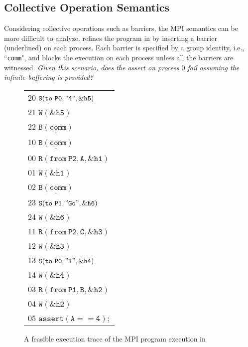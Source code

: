 
\subsection{Collective Operation Semantics}
Considering collective operations such as barriers, the MPI semantics can be more difficult to analyze.  refines the program in  by inserting a barrier (underlined) on each process. Each barrier is specified by a group identity, i.e., ``\texttt{comm}", and blocks the execution on each process unless all the barriers are witnessed. \textit{Given this scenario, does the assert on process $0$ fail assuming the infinite-buffering is provided?}

\examplefigoneB

\begin{figure}[c]
\begin{center}
\setlength{\tabcolsep}{2pt}
\small \begin{tabular}[t]{l}
20 $\mathtt{S(to\ P0, "4", \&h5)}$ \\
21 $\mathtt{W(\&h5)}$\\
22 $\mathtt{\underline{B(comm)}}$\\
\hline
10 $\mathtt{\underline{B(comm)}}$\\
\hline
00 $\mathtt{R(from\ P2, A, \&h1)}$ \\
01 $\mathtt{W(\&h1)}$ \\
02 $\mathtt{\underline{B(comm)}}$\\
\hline
23 $\mathtt{S(to\ P1, "Go", \&h6)}$ \\
24 $\mathtt{W(\&h6)}$ \\
\hline
11 $\mathtt{R(from\ P2, C, \&h3)}$ \\
12 $\mathtt{W(\&h3)}$ \\
13 $\mathtt{S(to\ P0, "1", \&h4)}$ \\
14 $\mathtt{W(\&h4)}$ \\
\hline
03 $\mathtt{R(from\ P1, B, \&h2)}$ \\
04 $\mathtt{W(\&h2)}$ \\
05 $\mathtt{assert(A == 4);}$ \\
\hline
\end{tabular}
\end{center}
\caption{A feasible execution trace of the MPI program execution in }
\label{fig:trace3}
\end{figure}


